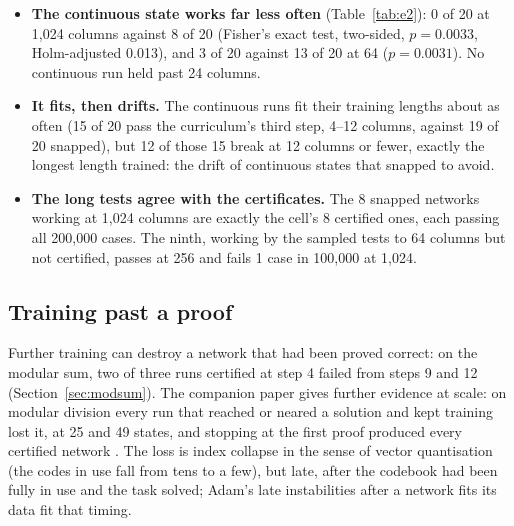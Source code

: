 \documentclass[11pt]{article}
\begin{document}
\begin{itemize}
\item \textbf{The continuous state works far less often} (Table~\ref{tab:e2}): 0 of 20 at 1{,}024
  columns against 8 of 20 (Fisher's exact test, two-sided, $p = 0.0033$, Holm-adjusted 0.013), and 3 of 20 against 13 of
  20 at 64 ($p = 0.0031$). No continuous run held past 24 columns.
\item \textbf{It fits, then drifts.} The continuous runs fit their training lengths about as often
  (15 of 20 pass the curriculum's third step, 4--12 columns, against 19 of 20 snapped), but 12 of
  those 15 break at 12 columns or fewer, exactly the longest length trained: the drift of continuous
  states that \citet{zeng-1993-self-clustering-recurrent-networks} snapped to avoid.
\item \textbf{The long tests agree with the certificates.} The 8 snapped networks working at
  1{,}024 columns are exactly the cell's 8 certified ones, each passing all 200{,}000 cases. The
  ninth, working by the sampled tests to 64 columns but not certified, passes at 256 and fails 1
  case in 100{,}000 at 1{,}024.
\end{itemize}

\subsection{Training past a proof}
\label{sec:collapse}

Further training can destroy a network that had been proved correct: on the modular sum, two of
three runs certified at step 4 failed from steps 9 and 12 (Section~\ref{sec:modsum}). The companion
paper gives further evidence at scale: on modular division every run that reached or neared a
solution and kept training lost it, at 25 and 49 states, and stopping at the first proof produced
every certified network \citep{barkhuizen-2026-certified-modular-division}. The loss is index
collapse in the sense of vector quantisation \citep{kaiser-2018-fast-decoding-discrete-latent-variables}
(the codes in use fall from tens to a few), but late, after the codebook had been fully in use and
the task solved; Adam's late instabilities after a network fits its data
\citep{thilak-2022-slingshot-mechanism-adaptive-optimizers} fit that timing.
\end{document}
